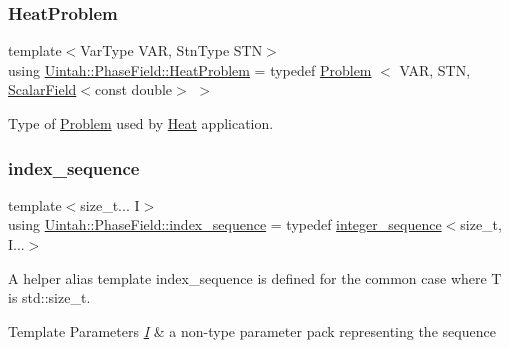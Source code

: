 \subsubsection{\texorpdfstring{Heat\+Problem}{HeatProblem}}
{\footnotesize\ttfamily template$<$Var\+Type V\+AR, Stn\+Type S\+TN$>$ \\
using \hyperlink{namespaceUintah_1_1PhaseField_af786d8e2489272b1c6903a1377df1f1b}{Uintah\+::\+Phase\+Field\+::\+Heat\+Problem} = typedef \hyperlink{classUintah_1_1PhaseField_1_1Problem}{Problem} $<$ V\+AR, S\+TN, \hyperlink{structUintah_1_1PhaseField_1_1ScalarField}{Scalar\+Field}$<$const double$>$ $>$}



Type of \hyperlink{classUintah_1_1PhaseField_1_1Problem}{Problem} used by \hyperlink{classUintah_1_1PhaseField_1_1Heat}{Heat} application. 

\mbox{\label{namespaceUintah_1_1PhaseField_a237de804d99512e50613aff7c94a9461}} 
\subsubsection{\texorpdfstring{index\+\_\+sequence}{index\_sequence}}
{\footnotesize\ttfamily template$<$size\+\_\+t... I$>$ \\
using \hyperlink{namespaceUintah_1_1PhaseField_a237de804d99512e50613aff7c94a9461}{Uintah\+::\+Phase\+Field\+::index\+\_\+sequence} = typedef \hyperlink{structUintah_1_1PhaseField_1_1integer__sequence}{integer\+\_\+sequence}$<$size\+\_\+t, I...$>$}

A helper alias template index\+\_\+sequence is defined for the common case where T is std\+::size\+\_\+t.


\begin{DoxyTemplParams}{Template Parameters}
{\em \hyperlink{structUintah_1_1PhaseField_1_1I}{I}} & a non-\/type parameter pack representing the sequence \\
\hline
\end{DoxyTemplParams}
\mbox{\label{namespaceUintah_1_1PhaseField_aa968ce550e38b580ce27a9f84cdf4145}} 
